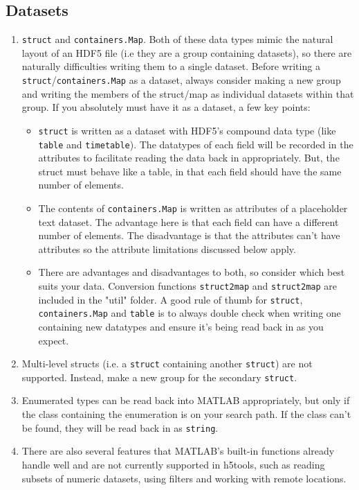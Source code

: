 \documentclass[11pt]{exam}
\newcommand\myfcn[1]{\colorbox{codegray}{\textcolor{codeblue}{\texttt{#1}}}}
\begin{document}
		\subsection{Datasets}
		\begin{enumerate}
			\item \texttt{struct} and \texttt{containers.Map}. Both of these data types mimic the natural layout of an HDF5 file (i.e they are a group containing datasets), so there are naturally difficulties writing them to a single dataset. Before writing a \texttt{struct}/\texttt{containers.Map} as a dataset, always consider making a new group and writing the members of the struct/map as individual datasets within that group. If you absolutely must have it as a dataset, a few key points:
			\begin{itemize}
				\item \texttt{struct} is written as a dataset with HDF5's compound data type (like \texttt{table} and \texttt{timetable}). The datatypes of each field will be recorded in the attributes to facilitate reading the data back in appropriately. But, the struct must behave like a table, in that each field should have the same number of elements.
				\item The contents of \texttt{containers.Map} is written as attributes of a placeholder text dataset. The advantage here is that each field can have a different number of elements. The disadvantage is that the attributes can't have attributes so the attribute limitations discussed below apply.
				\item There are advantages and disadvantages to both, so consider which best suits your data. Conversion functions \myfcn{struct2map} and \myfcn{struct2map} are included in the "util" folder. A good rule of thumb for \texttt{struct}, \texttt{containers.Map} and \texttt{table} is to always double check when writing one containing new datatypes and ensure it's being read back in as you expect.
			\end{itemize}

			\item Multi-level structs (i.e. a \texttt{struct} containing another \texttt{struct}) are not supported. Instead, make a new group for the secondary \texttt{struct}.
			\item Enumerated types can be read back into MATLAB appropriately, but only if the class containing the enumeration is on your search path. If the class can't be found, they will be read back in as \texttt{string}. 
			\item There are also several features that MATLAB's built-in functions already handle well and are not currently supported in h5tools, such as reading subsets of numeric datasets, using filters and working with remote locations. 
		\end{enumerate}
\end{document}

